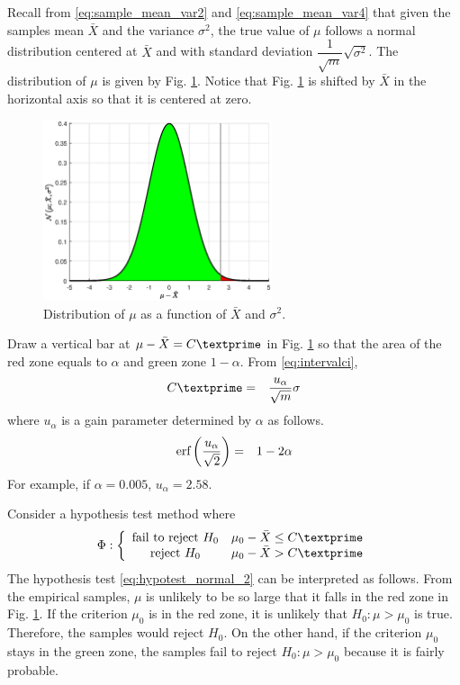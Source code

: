 Recall from \eqref{eq:sample_mean_var2} and \eqref{eq:sample_mean_var4} that given the samples mean $\bar{X}$ and the variance $\sigma^2$, the true value of $\mu$ follows a normal distribution centered at $\bar{X}$ and with standard deviation $\dfrac{1}{\sqrt{m}}\sqrt{\sigma^2}$. The distribution of $\mu$ is given by Fig. \ref{ch:hypothesis_normal_mean}. Notice that Fig. \ref{ch:hypothesis_normal_mean} is shifted by $\bar{X}$ in the horizontal axis so that it is centered at zero.
\begin{figure}[!htb]
	\centering
	\includegraphics[width=0.6\textwidth]{chapters/part-2/figures/hypothesis_normal_mean.eps}
	\caption{Distribution of $\mu$ as a function of $\bar{X}$ and $\sigma^2$.} \label{ch:hypothesis_normal_mean}
\end{figure}

Draw a vertical bar at $\mu-\bar{X}=C\textprime$ in Fig. \ref{ch:hypothesis_normal_mean} so that the area of the red zone equals to $\alpha$ and green zone $1-\alpha$. From \eqref{eq:intervalci},
\begin{eqnarray}
	C\textprime &=& \dfrac{u_\alpha}{\sqrt{m}}\sigma \nonumber
\end{eqnarray}
where $u_\alpha$ is a gain parameter determined by $\alpha$ as follows.
\begin{eqnarray}
	\textup{erf}\left(\dfrac{u_\alpha}{\sqrt{2}}\right) &=& 1-2\alpha \nonumber
\end{eqnarray}
For example, if $\alpha = 0.005$, $u_\alpha=2.58$. 

Consider a hypothesis test method where
\begin{eqnarray}
	\Phi : \left\{\begin{array}{cc}
		\textup{fail to reject~} H_0 & \mu_0 - \bar{X} \leq C\textprime \\
		\textup{reject~} H_0 & \mu_0 - \bar{X} > C\textprime
	\end{array}\right. \label{eq:hypotest_normal_2}
\end{eqnarray}
The hypothesis test \eqref{eq:hypotest_normal_2} can be interpreted as follows. From the empirical samples, $\mu$ is unlikely to be so large that it falls in the red zone in Fig. \ref{ch:hypothesis_normal_mean}. If the criterion $\mu_0$ is in the red zone, it is unlikely that $H_0: \mu > \mu_0$ is true. Therefore, the samples would reject $H_0$. On the other hand, if the criterion $\mu_0$ stays in the green zone, the samples fail to reject $H_0: \mu > \mu_0$ because it is fairly probable. 

